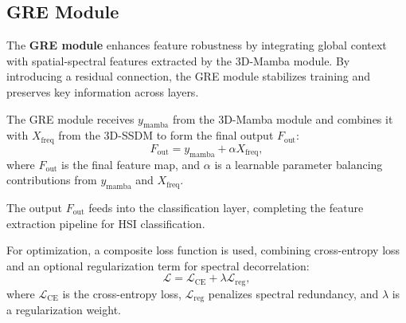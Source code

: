 \subsection{GRE Module}

The \textbf{GRE module} enhances feature robustness by integrating global context with spatial-spectral features extracted by the 3D-Mamba module. By introducing a residual connection, the GRE module stabilizes training and preserves key information across layers.

The GRE module receives \( y_{\text{mamba}} \) from the 3D-Mamba module and combines it with \( X_{\text{freq}} \) from the 3D-SSDM to form the final output \( F_{\text{out}} \):
\begin{equation}
F_{\text{out}} = y_{\text{mamba}} + \alpha X_{\text{freq}},
\end{equation}
where \( F_{\text{out}} \) is the final feature map, and \( \alpha \) is a learnable parameter balancing contributions from \( y_{\text{mamba}} \) and \( X_{\text{freq}} \).

The output \( F_{\text{out}} \) feeds into the classification layer, completing the feature extraction pipeline for HSI classification.

For optimization, a composite loss function is used, combining cross-entropy loss and an optional regularization term for spectral decorrelation:
\begin{equation}
\mathcal{L} = \mathcal{L}_{\text{CE}} + \lambda \mathcal{L}_{\text{reg}},
\end{equation}
where \( \mathcal{L}_{\text{CE}} \) is the cross-entropy loss, \( \mathcal{L}_{\text{reg}} \) penalizes spectral redundancy, and \( \lambda \) is a regularization weight.



